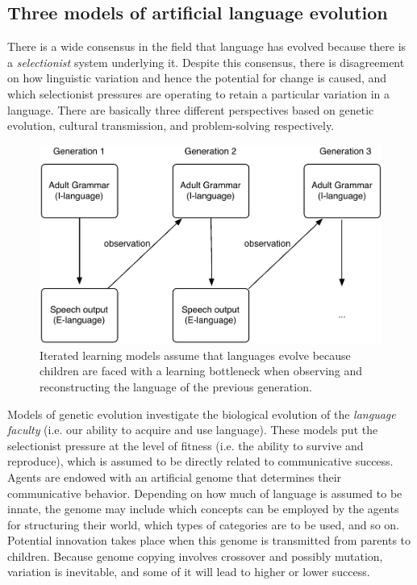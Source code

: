 \subsection{Three models of artificial language evolution}

There is a wide consensus in the field that language has evolved because there is a {\em selectionist} system underlying it. Despite this consensus, there is disagreement on how linguistic variation and hence the potential for change is caused, and which selectionist pressures are operating to retain a particular variation in a language. There are basically three different perspectives based on genetic evolution, cultural transmission, and problem-solving respectively.

\begin{figure}[t]
\centerline{\includegraphics[scale=0.55]{chap-introduction/figs/childbased}}
  \caption[Child-based language change]{Iterated learning models assume that languages evolve because children are faced with a learning bottleneck when observing and reconstructing the language of the previous generation.}
   \label{f:child-based}
\end{figure}

Models of genetic evolution \citep[e.g.][]{briscoe00grammatical, nowak01evolution} investigate the biological evolution of the {\em language faculty} (i.e. our ability to acquire and use language). These models put the selectionist pressure at the level of fitness (i.e. the ability to survive and reproduce), which is assumed to be directly related to communicative success. Agents are endowed with an artificial genome that determines their communicative behavior. Depending on how much of language is assumed to be innate, the genome may include which concepts can be employed by the agents for structuring their world, which types of categories are to be used, and so on. Potential innovation takes place when this genome is transmitted from parents to children. Because genome copying involves crossover and possibly mutation, variation is inevitable, and some of it will lead to higher or lower success.

